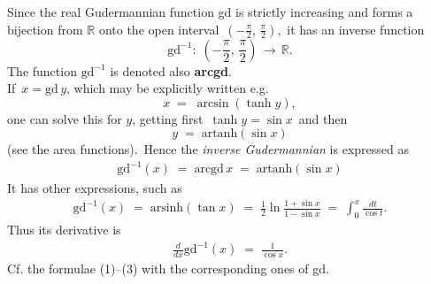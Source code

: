 \documentclass[12pt]{article}
\theoremstyle{definition}
\begin{document}
Since the real Gudermannian function gd is strictly increasing and forms a bijection from $\mathbb{R}$ onto the open interval \,$(-\frac{\pi}{2},\,\frac{\pi}{2})$,\, it has an inverse function
$$\mbox{gd}^{-1}\!:\; (-\frac{\pi}{2},\,\frac{\pi}{2})\, \to\, \mathbb{R}.$$
The function $\mbox{gd}^{-1}$ is denoted also \textbf{arcgd}.\\

If\, $x = \mbox{gd}\,y$, which may be explicitly written e.g.
$$x \;=\; \arcsin(\tanh{y}),$$
one can solve this for $y$, getting first\, $\tanh{y} = \sin{x}$\, and then
$$y \;=\; \mbox{artanh}(\sin{x})$$
(see the area functions).\, Hence the \emph{inverse Gudermannian} is expressed as
\begin{align}
\mbox{gd}^{-1}(x) \;=\; \mbox{arcgd}\,x \;=\; \mbox{artanh}(\sin{x})
\end{align}
It has other  expressions, such as
\begin{align}
\mbox{gd}^{-1}(x) \;=\; \mbox{arsinh}(\tan{x}) \;=\; \frac{1}{2}\ln\frac{1+\sin{x}}{1-\sin{x}}
\;=\; \int_0^x\!\frac{dt}{\cos{t}}.
\end{align}
Thus its derivative is
\begin{align}
\frac{d}{dx}\mbox{gd}^{-1}(x) \;=\; \frac{1}{\cos{x}}.
\end{align}
Cf. the formulae (1)--(3) with the corresponding ones of gd.


\end{document}
